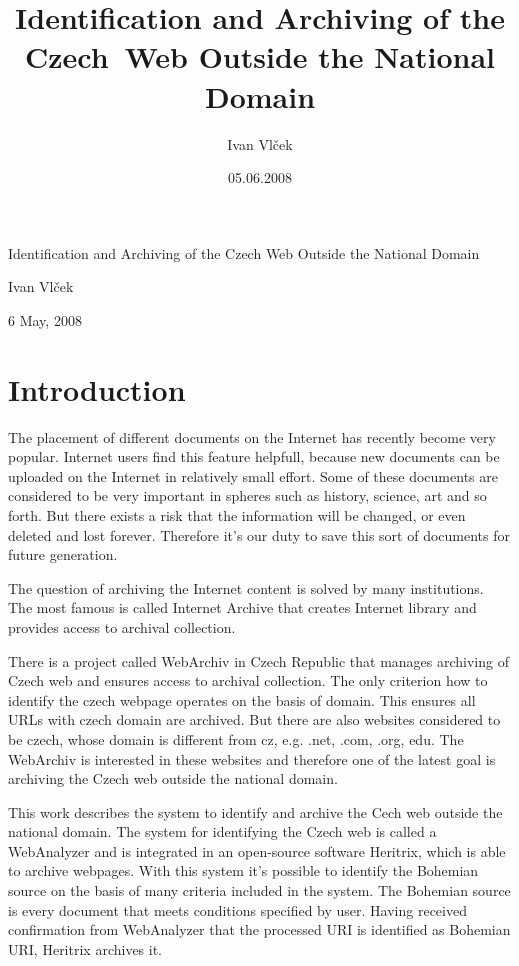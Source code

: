 \documentclass[11pt,a4paper]{article}
\title{Identification and Archiving of the Czech~Web Outside the National Domain}
\author{Ivan Vlček}
\date{05.06.2008}
\begin{document}
\begin{center}
\thispagestyle{empty}
\renewcommand{\thepage}{\Roman{page}}

\huge{Identification and Archiving of the Czech Web Outside the National Domain}

\vspace{5em}

\large{Ivan Vlček}

\normalsize{6 May, 2008}

\newpage
\thispagestyle{empty}
\renewcommand{\thepage}{\Roman{page}}
\tableofcontents

\end{center}
\newpage


\renewcommand{\thepage}{\arabic{page}}
\setcounter{page}{1}
\section{Introduction}

The placement of different documents on the Internet has recently become very popular. Internet users find this feature helpfull, because new documents can be uploaded on the Internet in relatively small effort. Some of these documents are considered to be very important in spheres such as hi\-sto\-ry, science, art and so forth. But there exists a risk that the information will be changed, or even deleted and lost forever. Therefore it's our duty to save this sort of documents for future generation.

The question of archiving the Internet content is solved by many institutions. The most famous is called Internet Archive that creates Internet library and provides access to archival collection.

There is a project called WebArchiv in Czech Republic that manages archiving of Czech web and ensures access to archival collection. The only criterion how to identify the czech webpage operates on the basis of domain. This ensures all URLs with czech domain are archived. But there are also websites considered to be czech, whose domain is different from cz, e.g. .net, .com, .org, edu. The WebArchiv is interested in these websites and therefore one of the latest goal is archiving the Czech web outside the national domain.

This work describes the system to identify and archive the Cech web outside the national domain. The system for identifying the Czech web is called a WebAnalyzer and is integrated in an open-source software Heritrix, which is able to archive webpages. With this system it's possible to identify the Bohemian source on the basis of many criteria included in the system. The Bohemian source is every document that meets conditions specified by user. Having received confirmation from WebAnalyzer that the processed URI is identified as Bohemian URI, Heritrix archives it.
\end{document}
